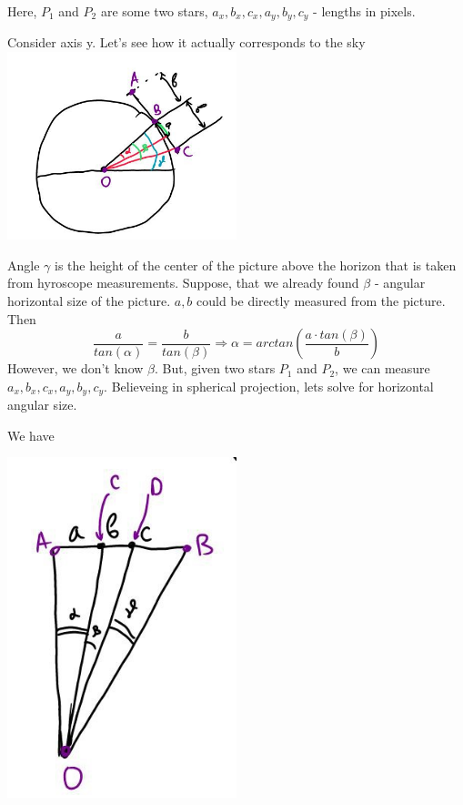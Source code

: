 \documentclass[a4paper,12pt]{article}
\begin{document}
\par \par
Here, \(P_1\) and \(P_2\) are some two stars, \(a_x, b_x, c_x, a_y, b_y, c_y\) - lengths in pixels.
\par
Consider axis y. Let's see how it actually corresponds to the sky
    \centering
    \includegraphics[width=0.5\textwidth]{size_if_know.jpg}
\par
Angle \(\gamma\) is the height of the center of the picture above the horizon that is taken from hyroscope measurements. Suppose, that we already found \(\beta\) - angular horizontal size of the picture. \(a, b\) could be directly measured from the picture. Then 
\begin{equation}
\frac{a}{tan(\alpha)} = \frac{b}{tan(\beta)} \Rightarrow \alpha = arctan( \frac{a \cdot tan(\beta)}{b})
 \end{equation}
However, we don't know \(\beta\). But, given two stars \(P_1\) and \(P_2\), we can measure \(a_x, b_x, c_x, a_y, b_y, c_y\). Believeing in spherical projection, lets solve for horizontal angular size.
\par
We have 
\par
   \centering
    \includegraphics[width=0.5\textwidth]{solving_triangle.jpg}
\end{document}
